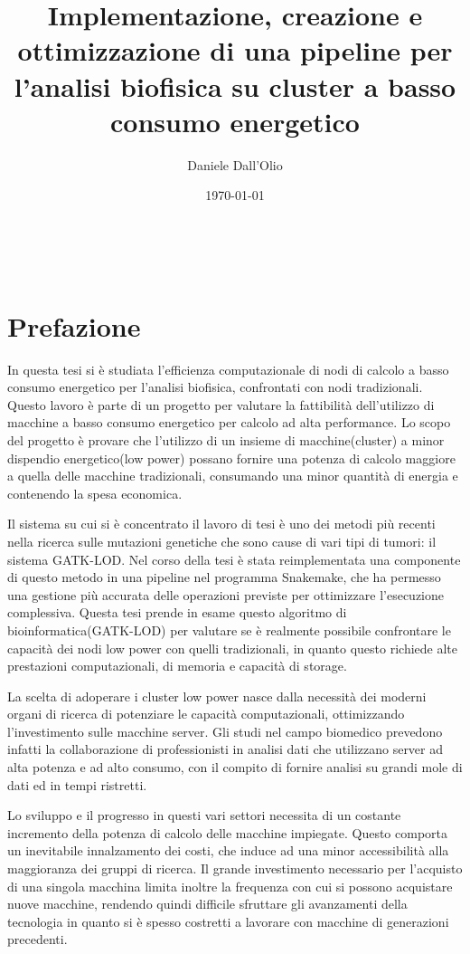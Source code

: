 \documentclass[12pt, a4paper]{report}
\title{Implementazione, creazione e ottimizzazione di una pipeline per l'analisi biofisica su cluster a basso consumo energetico}
\author{Daniele Dall'Olio}
\date{\today}
\begin{document}


\newpage
\
\newpage

\section*{Prefazione}
In questa tesi si è studiata l'efficienza computazionale di nodi di calcolo a basso consumo energetico per l'analisi biofisica, confrontati con nodi tradizionali.
Questo lavoro è parte di un progetto per valutare la fattibilità dell'utilizzo di macchine a basso consumo energetico per calcolo ad alta performance.
Lo scopo del progetto è provare che l'utilizzo di un insieme di macchine(cluster) a minor dispendio energetico(low power) possano fornire una potenza di calcolo maggiore a quella delle macchine tradizionali, consumando una minor quantità di energia e contenendo la spesa economica.  

Il sistema su cui si è concentrato il lavoro di tesi è uno dei metodi più recenti nella ricerca sulle mutazioni genetiche che sono cause di vari tipi di tumori: il sistema GATK-LOD.
Nel corso della tesi è stata reimplementata una componente di questo metodo in una pipeline nel programma Snakemake, che ha permesso una gestione più accurata delle operazioni previste per ottimizzare l'esecuzione complessiva. 
Questa tesi prende in esame questo algoritmo di bioinformatica(GATK-LOD\ped{n}) per valutare se è realmente possibile confrontare le capacità dei nodi low power con quelli tradizionali, in quanto questo richiede alte prestazioni computazionali, di memoria e capacità di storage.


La scelta di adoperare i cluster low power nasce dalla necessità dei moderni organi di ricerca di potenziare le capacità computazionali, ottimizzando l'investimento sulle macchine server.
Gli studi nel campo biomedico prevedono infatti la collaborazione di professionisti in analisi dati che utilizzano server ad alta potenza e ad alto consumo, con il compito di fornire analisi su grandi mole di dati ed in tempi ristretti.

Lo sviluppo e il progresso in questi vari settori necessita di un costante incremento della potenza di calcolo delle macchine impiegate.
Questo comporta un inevitabile innalzamento dei costi, che induce ad una minor accessibilità alla maggioranza dei gruppi di ricerca.
Il grande investimento necessario per l'acquisto di una singola macchina limita inoltre la frequenza con cui si possono acquistare nuove macchine, rendendo quindi difficile sfruttare gli avanzamenti della tecnologia in quanto si è spesso costretti a lavorare con macchine di generazioni precedenti.
\end{document}
